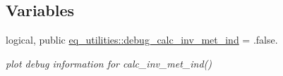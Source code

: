 \subsection*{Variables}
\begin{DoxyCompactItemize}
\item 
logical, public \hyperlink{namespaceeq__utilities_aedf0e1858d0bd16218a290f4857d416a}{eq\+\_\+utilities\+::debug\+\_\+calc\+\_\+inv\+\_\+met\+\_\+ind} = .false.
\begin{DoxyCompactList}\small\item\em plot debug information for calc\+\_\+inv\+\_\+met\+\_\+ind() \end{DoxyCompactList}\end{DoxyCompactItemize}
